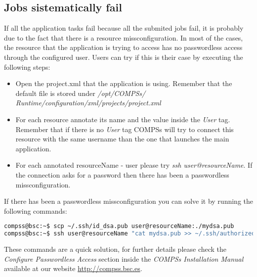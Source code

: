 \subsection{Jobs sistematically fail}
If all the application tasks fail because all the submited jobs fail, it is probably due to the fact that there is a resource 
missconfiguration. In most of the cases, the resource that the application is trying to access has no passwordless access through
the configured user. Users can try if this is their case by executing the following steps:
\begin{itemize}
 \item Open the project.xml that the application is using. Remember that the default file is stored under \textit{/opt/COMPSs/
 Runtime/configuration/xml/projects/project.xml}
 \item For each resource annotate its name and the value inside the \textit{User} tag. Remember that if there is no \textit{User}
 tag COMPSs will try to connect this resource with the same username than the one that launches the main application.
 \item For each annotated resourceName - user please try \textit{ssh user@resourceName}. If the connection asks for a password then
 there has been a passwordless missconfiguration.
\end{itemize}

If there has been a passwordless missconfiguration you can solve it by running the following commands:
\begin{lstlisting}[language=bash]
compss@bsc:~$ scp ~/.ssh/id_dsa.pub user@resourceName:./mydsa.pub
compss@bsc:~$ ssh user@resourceName "cat mydsa.pub >> ~/.ssh/authorized_keys; rm ./mydsa.pub"
\end{lstlisting}

These commands are a quick solution, for further details please check the \textit{Configure Passwordless Access} section 
inside the \textit{COMPSs Installation Manual} available at our website \url{http://compss.bsc.es}.
